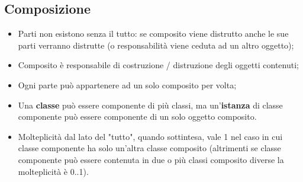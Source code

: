 \documentclass{article}
\begin{document}
    \subsection{Composizione}
      \begin{itemize}
        \item Parti non esistono senza il tutto: se composito viene distrutto anche le sue parti verranno distrutte (o responsabilità viene ceduta ad un altro oggetto); 
        \item Composito è responsabile di costruzione / distruzione degli oggetti contenuti;
        \item Ogni parte può appartenere ad un solo composito per volta;
        \item Una \textbf{classe} può essere componente di più classi, ma un'\textbf{istanza} di classe componente può essere componente di un solo oggetto composito.
        \item Molteplicità dal lato del "tutto", quando sottintesa, vale 1 nel caso in cui classe componente ha solo un'altra classe composito (altrimenti se classe componente può essere contenuta in due o più classi composito diverse la molteplicità è 0..1).
      \end{itemize}
\end{document}
